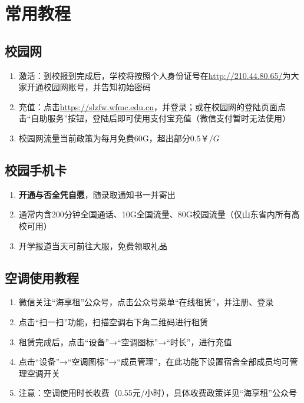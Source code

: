 \chapter[常用教程]{常用教程}

\section[校园网]{校园网}
\begin{enumerate}
    \item 激活：到校报到完成后，学校将按照个人身份证号在\uline{\href{http://210.44.80.65/}{http://210.44.80.65/}}为大家开通校园网账号，并告知初始密码\footnotemark
    \item 充值：点击\uline{\href{https://slzfw.wfmc.edu.cn}{https://slzfw.wfmc.edu.cn}}，并登录；或在校园网的登陆页面点击“自助服务”按钮\footnotemark，登陆后即可使用支付宝充值（微信支付暂时无法使用）
    \item 校园网流量当前政策为每月免费60G，超出部分$0.5￥/G$
\end{enumerate}

\section[校园手机卡]{校园手机卡}
\begin{enumerate}
    \item \textbf{开通与否全凭自愿}，随录取通知书一并寄出
    \item 通常内含200分钟全国通话、10G全国流量、80G校园流量（仅山东省内所有高校可用）
    \item 开学报道当天可前往大服，免费领取礼品
\end{enumerate}

\section[空调使用教程]{空调使用教程}
\begin{enumerate}
    \item 微信关注“海享租”公众号，点击公众号菜单“在线租赁”，并注册、登录
    \item 点击“扫一扫”功能，扫描空调右下角二维码进行租赁
    \item 租赁完成后，点击“设备”→“空调图标”→“时长”，进行充值
    \item 点击“设备”→“空调图标”→“成员管理”，在此功能下设置宿舍全部成员均可管理空调开关
    \item 注意：空调使用时长收费（0.55元/小时），具体收费政策详见“海享租”公众号
\end{enumerate}


